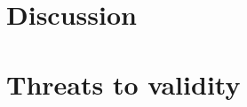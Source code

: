 \section{Discussion}
\label{sec:discussion}


\section{Threats to validity}
\label{sec:threats-to-validity}


